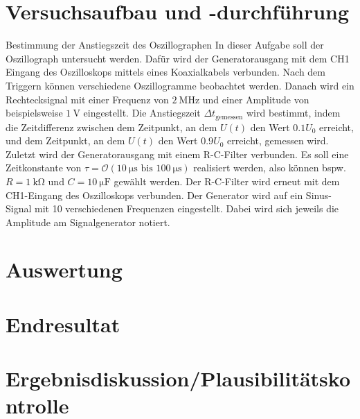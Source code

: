 \documentclass[ngerman]{scrartcl}
\theoremstyle{definition}
\begin{document}
	\section{Versuchsaufbau und -durchführung}
	\begin{aufgabe}{Bestimmung der Anstiegszeit des Oszillographen}
		In dieser Aufgabe soll der Oszillograph untersucht werden. Dafür wird der Generatorausgang mit dem CH1 Eingang des Oszilloskops mittels eines Koaxialkabels verbunden. Nach dem Triggern können verschiedene Oszillogramme beobachtet werden.
				Danach wird ein Rechtecksignal mit einer Frequenz von $\SI{2}{\mega\hertz}$ und einer Amplitude von beispielsweise $\SI{1}{\volt}$ eingestellt. Die Anstiegszeit $\Delta t_\mathrm{gemessen}$ wird bestimmt, indem die Zeitdifferenz zwischen dem Zeitpunkt, an dem $U(t)$ den Wert $0.1 U_0$ erreicht, und dem Zeitpunkt, an dem $U(t)$ den Wert $0.9 U_0$ erreicht, gemessen wird.
				Zuletzt wird der Generatorausgang mit einem R-C-Filter verbunden. Es soll eine Zeitkonstante von $\tau = \mathcal{O}(\SI{10}{\micro\second} \text{ bis } \SI{100}{\micro\second})$ realisiert werden, also können bspw. $R = \SI{1}{\kilo\ohm}$ und $C = \SI{10}{\micro\farad}$ gewählt werden. Der R-C-Filter wird erneut mit dem CH1-Eingang des Oszilloskops verbunden. Der Generator wird auf ein Sinus-Signal mit 10 verschiedenen Frequenzen eingestellt. Dabei wird sich jeweils die Amplitude am Signalgenerator notiert.
	\end{aufgabe}
	
	
	\section{Auswertung}
	\section{Endresultat}
	\section{Ergebnisdiskussion/Plausibilitätskontrolle}
\end{document}
